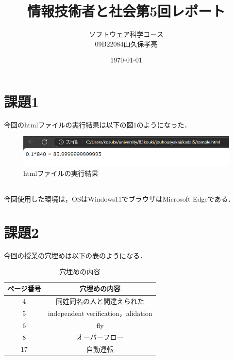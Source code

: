 \documentclass[dvipdfmx]{jarticle}
\title{情報技術者と社会第5回レポート}
\author{ソフトウェア科学コース\\09B22084山久保孝亮}
\date{\today}
\begin{document}
\maketitle
\section{課題1}
今回のhtmlファイルの実行結果は以下の図1のようになった．
\begin{figure}[h]
    \centering
    \includegraphics[width=12cm]{kadai5-1.png}
    \caption{htmlファイルの実行結果}
\end{figure}
\\今回使用した環境は，OSはWindows11でブラウザはMicrosoft Edgeである．
\section{課題2}
今回の授業の穴埋めは以下の表のようになる．
\begin{table}[h]
    \centering
    \begin{tabular}{|c|c|}
        \hline
        ページ番号 & 穴埋めの内容\\\hline\hline
        4 & 同姓同名の人と間違えられた\\\hline
        5 & independent verification，alidation\\\hline
        6 & fly\\\hline
        8 & オーバーフロー\\\hline
        17 & 自動運転\\\hline
    \end{tabular}
    \caption{穴埋めの内容}
\end{table}
\end{document}

